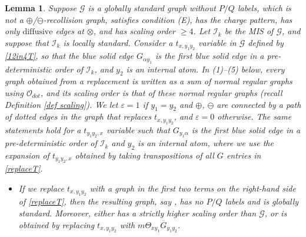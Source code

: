 \documentclass{article}
\newcommand{\1}{\mathds{1}}
\numberwithin{equation}{section}
\newcommand{\al}{\alpha}
\renewcommand{\cal}{\mathcal}
\newcommand{\wt}{\widetilde}
\renewcommand{\epsilon}{\varepsilon}
\renewcommand{\leq}{\leqslant}
\renewcommand{\geq}{\geqslant}
\renewcommand{\le}{\leq}
\renewcommand{\ge}{\geq}
\newcommand{\dashed}{\text{diffusive}}
\theoremstyle{plain} %
\newtheorem{lemma}[theorem]{Lemma}
\theoremstyle{remark}
\newcommand{\Sele}{{\mathcal E}}
\newcommand{\Iso}{{\mathcal I}}
\begin{document}


\begin{lemma}\label{lem globalgood}
Suppose $\cal G$ is a globally standard graph without $P/Q$ labels, which is not a $\oplus$/$\ominus$-recollision graph, satisfies condition (E), has the charge pattern, has only $\dashed$ edges at $\otimes$, and has scaling order $\ge 4$. Let $\Iso_k$ be the MIS of $\cal G$, and suppose that $\Iso_k$ is locally standard. Consider a $t_{x,y_1y_2}$ variable in $\cal G$ defined by \eqref{12in4T}, so that the blue solid edge $G_{\al y_1}$ is %
the first blue solid edge in a pre-deterministic order of $\Iso_k$, and $y_2$ is an internal atom. In (1)--(5) below, every graph obtained from a replacement is written as a sum of normal regular graphs using $\cal O_{dot}$, and its scaling order is that of these normal regular graphs (recall Definition \ref{def scaling}). We let $\epsilon=1$ if $y_1=y_2$ and $\oplus$, $\ominus$ are connected by a path of dotted edges in the graph that replaces $t_{x,y_1y_2}$, and $\epsilon=0$ otherwise.
The same statements hold for a $t_{y_1y_2,x}$ variable such that $G_{y_1\al}$ is the first blue solid edge in a pre-deterministic order of $\Iso_k$ and $y_2$ is an internal atom, where we use the expansion of $t_{y_1y_2,x}$ obtained by taking transpositions of all $G$ entries in \eqref{replaceT}.
  

\begin{itemize}
\item[(1)] If we replace $t_{x,y_1y_2}$ with a graph in the first two terms on the right-hand side of \eqref{replaceT},
then the resulting graph, say \smash{$\wt{\cal G}$}, has no $P/Q$ labels and is globally standard. %
Moreover, \smash{$\wt{\cal G}$} either has a strictly higher scaling order than $\cal G$, or is obtained by replacing $t_{x,y_1y_2}$ with $ m\Theta_{xy_1}\overline G_{y_1y_2}$.


\end{itemize}
\end{lemma}
\end{document}
